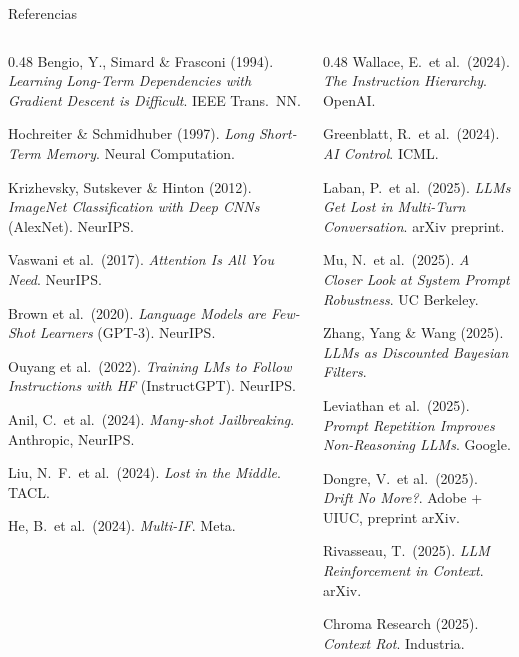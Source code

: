 \documentclass[aspectratio=169, 11pt]{beamer}
\begin{document}
\begin{frame}{Referencias}

\scriptsize
\begin{columns}[T]
\begin{column}{0.48\textwidth}
Bengio, Y., Simard \& Frasconi (1994). \emph{Learning Long-Term Dependencies with Gradient Descent is Difficult}. IEEE Trans.\ NN.\par\medskip
Hochreiter \& Schmidhuber (1997). \emph{Long Short-Term Memory}. Neural Computation.\par\medskip
Krizhevsky, Sutskever \& Hinton (2012). \emph{ImageNet Classification with Deep CNNs} (AlexNet). NeurIPS.\par\medskip
Vaswani et al.\ (2017). \emph{Attention Is All You Need}. NeurIPS.\par\medskip
Brown et al.\ (2020). \emph{Language Models are Few-Shot Learners} (GPT-3). NeurIPS.\par\medskip
Ouyang et al.\ (2022). \emph{Training LMs to Follow Instructions with HF} (InstructGPT). NeurIPS.\par\medskip
Anil, C.\ et al.\ (2024). \emph{Many-shot Jailbreaking}. Anthropic, NeurIPS.\par\medskip
Liu, N.\ F.\ et al.\ (2024). \emph{Lost in the Middle}. TACL.\par\medskip
He, B.\ et al.\ (2024). \emph{Multi-IF}. Meta.\par
\end{column}

\begin{column}{0.48\textwidth}
Wallace, E.\ et al.\ (2024). \emph{The Instruction Hierarchy}. OpenAI.\par\medskip
Greenblatt, R.\ et al.\ (2024). \emph{AI Control}. ICML.\par\medskip
Laban, P.\ et al.\ (2025). \emph{LLMs Get Lost in Multi-Turn Conversation}. arXiv preprint.\par\medskip
Mu, N.\ et al.\ (2025). \emph{A Closer Look at System Prompt Robustness}. UC Berkeley.\par\medskip
Zhang, Yang \& Wang (2025). \emph{LLMs as Discounted Bayesian Filters}.\par\medskip
Leviathan et al.\ (2025). \emph{Prompt Repetition Improves Non-Reasoning LLMs}. Google.\par\medskip
Dongre, V.\ et al.\ (2025). \emph{Drift No More?}. Adobe + UIUC, preprint arXiv.\par\medskip
Rivasseau, T.\ (2025). \emph{LLM Reinforcement in Context}. arXiv.\par\medskip
Chroma Research (2025). \emph{Context Rot}. Industria.\par
\end{column}
\end{columns}

\end{frame}
\end{document}
